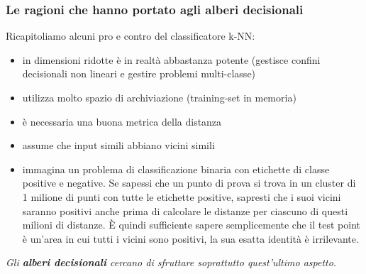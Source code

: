 \begin{frame}
	
	\frametitle{Le ragioni che hanno portato agli alberi decisionali}
		
		Ricapitoliamo alcuni pro e contro del classificatore k-NN:
		\pause
		\begin{itemize}
			\item in dimensioni ridotte è in realtà abbastanza potente (gestisce confini decisionali non lineari e gestire problemi multi-classe)
			\pause
			\item utilizza molto spazio di archiviazione (training-set in memoria)
			\pause
			\item è necessaria una buona metrica della distanza
			\pause
			\item assume che input simili abbiano vicini simili%
			\pause
			\item immagina un problema di classificazione binaria con etichette di classe positive e negative. Se sapessi che un punto di prova si trova in un cluster di 1 milione di punti con tutte le etichette positive, sapresti che i suoi vicini saranno positivi anche prima di calcolare le distanze per ciascuno di questi milioni di distanze. È quindi sufficiente sapere semplicemente che il test point è un'area in cui tutti i vicini sono positivi, la sua esatta identità è irrilevante.
		\end{itemize}
		\pause
		\textit{Gli \textbf{alberi decisionali} cercano di sfruttare soprattutto quest'ultimo aspetto.}

\end{frame}


